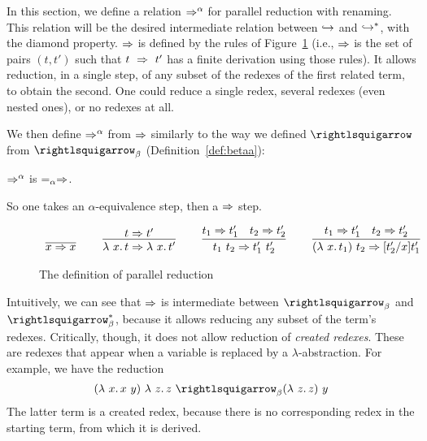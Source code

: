 In this section, we define a relation $\Pred^\alpha$ for parallel reduction with renaming\index{$\Pred^\alpha$}.  This relation will be the desired
intermediate relation between $\hookrightarrow$ and $\hookrightarrow^*$, with the diamond property.  $\Pred$ is defined
by the rules of Figure~\ref{fig:pred} (i.e., $\Pred$ is the set of pairs $(t,t')$ such that $t\ \Rightarrow\ t'$ has a finite
derivation using those rules).  It allows reduction, in a single step, of any subset of the redexes of the first related term,
to obtain the second.  One could reduce a single redex, several redexes (even nested ones), or no redexes at all.

We then define $\Pred^\alpha$ from $\Pred$ similarly to the way we defined $\betaa$ from
$\betaa_\beta$ (Definition~\ref{def:betaa})\index{$\Pred$}:

\begin{definition}
  $\Pred^\alpha$ is $=_\alpha\Rightarrow $.
\end{definition}
\noindent So one takes an $\alpha$-equivalence step, then a $\Pred$ step.

\newcommand{\predvar}[0]{\infer{x \Pred x}{\ }}

\newcommand{\predlam}[0]{\infer{\lam{x}{t} \Pred \lam{x}{t'}}{t \Pred t'}}

\newcommand{\predapp}[0]{\infer{t_1\ t_2 \Pred t_1'\ t_2'}{t_1 \Pred t_1' & t_2 \Pred t_2'}}

\newcommand{\predbeta}[0]{\infer{(\lam{x}{t_1})\ t_2 \Pred [t_2'/x]t_1'}{t_1 \Pred t_1' & t_2 \Pred t_2'}}

\begin{figure}
\[
\begin{array}{lllllll}
\predvar

& \ &

\predlam

& \ &

\predapp

& \ &

\predbeta
 
\end{array}
\]
\caption{The definition of parallel reduction}
\label{fig:pred}
\end{figure}

Intuitively, we can see that $\Pred$ is intermediate between $\curva_\beta$ and $\curva_\beta^*$, because
it allows reducing any subset of the term's redexes.  Critically, though, it does not allow reduction
of \emph{created redexes}.  These are redexes that appear when a variable is replaced by a $\lambda$-abstraction.  For example, we have the reduction
\[
(\lam{x}{x\ y})\ \lam{z}{z}\ \curva_\beta (\lam{z}{z})\ y
\]
\noindent The latter term is a created redex, because there is no corresponding redex in the starting term, from which it is derived.

